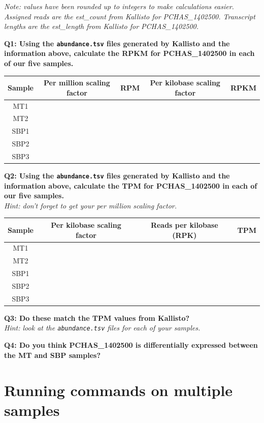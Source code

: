 \documentclass[11pt]{article}
\begin{document}
\textit{Note: values have been rounded up to integers to make calculations
easier. Assigned reads are the est\_count from Kallisto for
PCHAS\_1402500. Transcript lengths are the est\_length from Kallisto for
PCHAS\_1402500.}

\newpage

\textbf{Q1: Using the \texttt{abundance.tsv} files generated by Kallisto
and the information above, calculate the RPKM for PCHAS\_1402500 in each
of our five samples.}

\begin{longtable}[]{@{}ccccc@{}}
\toprule
Sample & Per million scaling factor & RPM & Per kilobase scaling factor
& RPKM\tabularnewline
\midrule
\endhead
MT1 & & & &\tabularnewline
MT2 & & & &\tabularnewline
SBP1 & & & &\tabularnewline
SBP2 & & & &\tabularnewline
SBP3 & & & &\tabularnewline
\bottomrule
\end{longtable}

\textbf{Q2: Using the \texttt{abundance.tsv} files generated by Kallisto
and the information above, calculate the TPM for PCHAS\_1402500 in each
of our five samples.}\\
\textit{Hint: don't forget to get your per million scaling factor.}

\begin{longtable}[]{@{}cccc@{}}
\toprule
Sample & Per kilobase scaling factor & Reads per kilobase (RPK) &
TPM\tabularnewline
\midrule
\endhead
MT1 & & &\tabularnewline
MT2 & & &\tabularnewline
SBP1 & & &\tabularnewline
SBP2 & & &\tabularnewline
SBP3 & & &\tabularnewline
\bottomrule
\end{longtable}

\textbf{Q3: Do these match the TPM values from Kallisto?}\\
\textit{Hint: look at the \texttt{abundance.tsv} files for each of your
samples.}

\textbf{Q4: Do you think PCHAS\_1402500 is differentially expressed
between the MT and SBP samples?}




\newpage





    \hypertarget{running-commands-on-multiple-samples}{%
\section{Running commands on multiple
samples}\label{running-commands-on-multiple-samples}}
\end{document}

